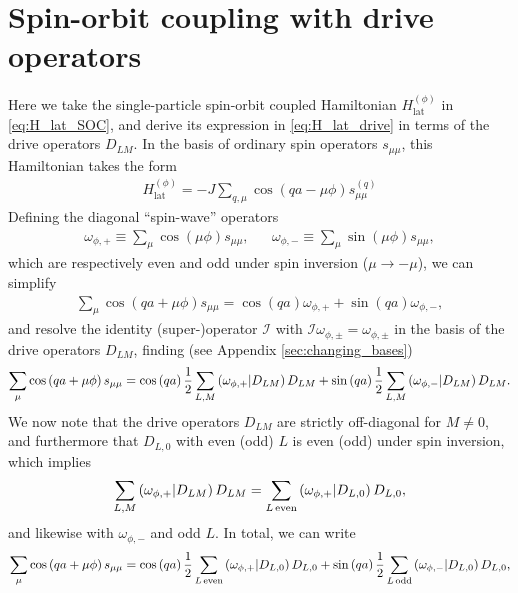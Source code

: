 \documentclass[nofootinbib,notitlepage,11pt]{revtex4-2}
\renewcommand{\t}{\text} %
\newcommand{\f}[2]{\dfrac{#1}{#2}} %
\newcommand{\p}[1]{\left(#1\right)} %
\newcommand{\1}{\mathds{1}}
\newcommand{\I}{\mathcal{I}}
\def\obk#1{\mathinner{({#1})}}
\begin{document}
\section{Spin-orbit coupling with drive operators}
\label{sec:lat_drive}

Here we take the single-particle spin-orbit coupled Hamiltonian
$H_{\t{lat}}^{(\phi)}$ in \eqref{eq:H_lat_SOC}, and derive its
expression in \eqref{eq:H_lat_drive} in terms of the drive operators
$D_{LM}$.  In the basis of ordinary spin operators $s_{\mu\mu}$, this
Hamiltonian takes the form
\begin{align}
  H_{\t{lat}}^{(\phi)}
  = -J \sum_{q,\mu} \cos\p{qa-\mu\phi} s_{\mu\mu}^{(q)}
  \label{eq:H_lat_spin}
\end{align}
Defining the diagonal ``spin-wave'' operators
\begin{align}
  \omega_{\phi,+} \equiv \sum_\mu \cos\p{\mu\phi} s_{\mu\mu},
  &&
  \omega_{\phi,-} \equiv \sum_\mu \sin\p{\mu\phi} s_{\mu\mu},
\end{align}
which are respectively even and odd under spin inversion
($\mu\to-\mu$), we can simplify
\begin{align}
  \sum_\mu \cos\p{qa+\mu\phi} s_{\mu\mu}
  = \cos\p{qa} \omega_{\phi,+} + \sin\p{qa} \omega_{\phi,-},
\end{align}
and resolve the identity (super-)operator $\I$ with
$\I \omega_{\phi,\pm} = \omega_{\phi,\pm}$ in the basis of the drive
operators $D_{LM}$, finding (see Appendix \ref{sec:changing_bases})
\begin{align}
  \sum_\mu \cos\p{qa+\mu\phi} s_{\mu\mu}
  = \cos\p{qa} \f12 \sum_{L,M} \obk{\omega_{\phi,+}|D_{LM}} D_{LM}
  + \sin\p{qa} \f12 \sum_{L,M} \obk{\omega_{\phi,-}|D_{LM}} D_{LM}.
\end{align}
We now note that the drive operators $D_{LM}$ are strictly
off-diagonal for $M\ne0$, and furthermore that $D_{L,0}$ with even
(odd) $L$ is even (odd) under spin inversion, which implies
\begin{align}
  \sum_{L,M} \obk{\omega_{\phi,+}|D_{LM}} D_{LM}
  = \sum_{L\,\t{even}} \obk{\omega_{\phi,+}|D_{L,0}} D_{L,0},
\end{align}
and likewise with $\omega_{\phi,-}$ and odd $L$.  In total, we can
write
\begin{align}
  \sum_\mu \cos\p{qa+\mu\phi} s_{\mu\mu}
  = \cos\p{qa} \f12 \sum_{L\,\t{even}}
  \obk{\omega_{\phi,+}|D_{L,0}} D_{L,0}
  + \sin\p{qa} \f12 \sum_{L\,\t{odd}}
  \obk{\omega_{\phi,-}|D_{L,0}} D_{L,0},
\end{align}
\end{document}
